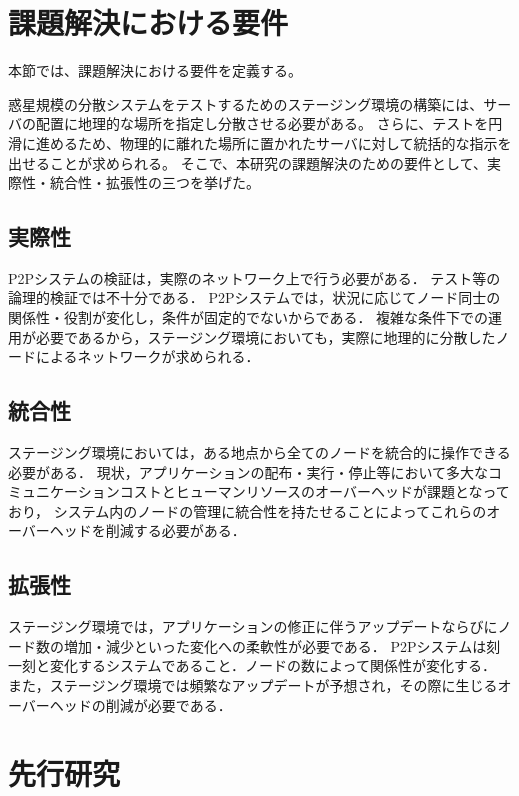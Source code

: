 \section{課題解決における要件}
\label{issue:requirements}

本節では、課題解決における要件を定義する。

惑星規模の分散システムをテストするためのステージング環境の構築には、サーバの配置に地理的な場所を指定し分散させる必要がある。
さらに、テストを円滑に進めるため、物理的に離れた場所に置かれたサーバに対して統括的な指示を出せることが求められる。
そこで、本研究の課題解決のための要件として、実際性・統合性・拡張性の三つを挙げた。

\subsection{実際性}
\label{issue:requirements1}

P2Pシステムの検証は，実際のネットワーク上で行う必要がある．
テスト等の論理的検証では不十分である．
P2Pシステムでは，状況に応じてノード同士の関係性・役割が変化し，条件が固定的でないからである．
複雑な条件下での運用が必要であるから，ステージング環境においても，実際に地理的に分散したノードによるネットワークが求められる．

\subsection{統合性}
\label{issue:requirements2}

ステージング環境においては，ある地点から全てのノードを統合的に操作できる必要がある．
現状，アプリケーションの配布・実行・停止等において多大なコミュニケーションコストとヒューマンリソースのオーバーヘッドが課題となっており，
システム内のノードの管理に統合性を持たせることによってこれらのオーバーヘッドを削減する必要がある．

\subsection{拡張性}
\label{issue:requirements3}

ステージング環境では，アプリケーションの修正に伴うアップデートならびにノード数の増加・減少といった変化への柔軟性が必要である．
P2Pシステムは刻一刻と変化するシステムであること．ノードの数によって関係性が変化する．
また，ステージング環境では頻繁なアップデートが予想され，その際に生じるオーバーヘッドの削減が必要である．

\section{先行研究}
\label{issue:previous-research}

